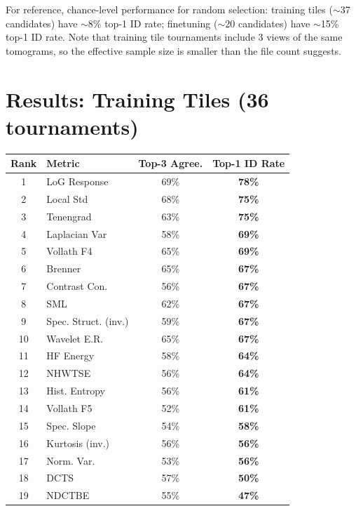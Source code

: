 \documentclass[11pt]{article}
\begin{document}
For reference, chance-level performance for random selection: training tiles ($\sim$37 candidates) have $\sim$8\% top-1 ID rate; finetuning ($\sim$20 candidates) have $\sim$15\% top-1 ID rate. Note that training tile tournaments include 3 views of the same tomograms, so the effective sample size is smaller than the file count suggests.

\section{Results: Training Tiles (36 tournaments)}

\vspace{0.5em}
\begin{center}
\small
\begin{tabular}{clcc}
\toprule
\textbf{Rank} & \textbf{Metric} & \textbf{Top-3 Agree.} & \textbf{Top-1 ID Rate} \\
\midrule
\rowcolor{toprow} 1 & LoG Response & 69\% & \textbf{78\%} \\
\rowcolor{toprow} 2 & Local Std & 68\% & \textbf{75\%} \\
\rowcolor{toprow} 3 & Tenengrad & 63\% & \textbf{75\%} \\
\rowcolor{toprow} 4 & Laplacian Var & 58\% & \textbf{69\%} \\
\rowcolor{toprow} 5 & Vollath F4 & 65\% & \textbf{69\%} \\
\rowcolor{toprow} 6 & Brenner & 65\% & \textbf{67\%} \\
\rowcolor{toprow} 7 & Contrast Con. & 56\% & \textbf{67\%} \\
\rowcolor{toprow} 8 & SML & 62\% & \textbf{67\%} \\
\rowcolor{toprow} 9 & Spec. Struct. (inv.) & 59\% & \textbf{67\%} \\
\rowcolor{toprow} 10 & Wavelet E.R. & 65\% & \textbf{67\%} \\
\rowcolor{toprow} 11 & HF Energy & 58\% & \textbf{64\%} \\
\rowcolor{toprow} 12 & NHWTSE & 56\% & \textbf{64\%} \\
\rowcolor{toprow} 13 & Hist. Entropy & 56\% & \textbf{61\%} \\
\rowcolor{toprow} 14 & Vollath F5 & 52\% & \textbf{61\%} \\
\rowcolor{toprow} 15 & Spec. Slope & 54\% & \textbf{58\%} \\
\rowcolor{toprow} 16 & Kurtosis (inv.) & 56\% & \textbf{56\%} \\
\rowcolor{toprow} 17 & Norm. Var. & 53\% & \textbf{56\%} \\
\rowcolor{toprow} 18 & DCTS & 57\% & \textbf{50\%} \\
\rowcolor{toprow} 19 & NDCTBE & 55\% & \textbf{47\%} \\
\bottomrule
\end{tabular}
\end{center}
\end{document}
